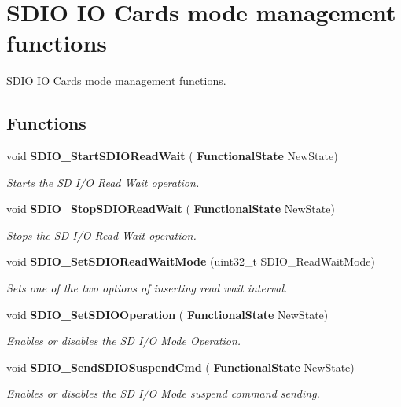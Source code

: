 \section{S\+D\+IO IO Cards mode management functions}
\label{group__SDIO__Group4}


S\+D\+IO IO Cards mode management functions.  


\subsection*{Functions}
\begin{DoxyCompactItemize}
\item 
void \textbf{ S\+D\+I\+O\+\_\+\+Start\+S\+D\+I\+O\+Read\+Wait} (\textbf{ Functional\+State} New\+State)
\begin{DoxyCompactList}\small\item\em Starts the SD I/O Read Wait operation. \end{DoxyCompactList}\item 
void \textbf{ S\+D\+I\+O\+\_\+\+Stop\+S\+D\+I\+O\+Read\+Wait} (\textbf{ Functional\+State} New\+State)
\begin{DoxyCompactList}\small\item\em Stops the SD I/O Read Wait operation. \end{DoxyCompactList}\item 
void \textbf{ S\+D\+I\+O\+\_\+\+Set\+S\+D\+I\+O\+Read\+Wait\+Mode} (uint32\+\_\+t S\+D\+I\+O\+\_\+\+Read\+Wait\+Mode)
\begin{DoxyCompactList}\small\item\em Sets one of the two options of inserting read wait interval. \end{DoxyCompactList}\item 
void \textbf{ S\+D\+I\+O\+\_\+\+Set\+S\+D\+I\+O\+Operation} (\textbf{ Functional\+State} New\+State)
\begin{DoxyCompactList}\small\item\em Enables or disables the SD I/O Mode Operation. \end{DoxyCompactList}\item 
void \textbf{ S\+D\+I\+O\+\_\+\+Send\+S\+D\+I\+O\+Suspend\+Cmd} (\textbf{ Functional\+State} New\+State)
\begin{DoxyCompactList}\small\item\em Enables or disables the SD I/O Mode suspend command sending. \end{DoxyCompactList}\end{DoxyCompactItemize}


